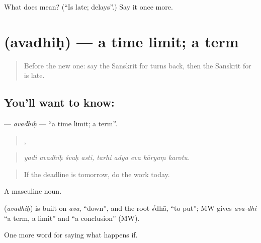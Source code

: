 \begin{tcolorbox}[breakable,colback=teal!4,colframe=teal!35!black,title={Before you move on}]
What does  mean? (\textquotedblleft{}Is late; delays\textquotedblright{}.) Say it once more.
\end{tcolorbox}
\section[\texorpdfstring{\sk{अवधिः} (avadhiḥ)}{अवधिः (avadhiḥ)}]{ (avadhiḥ) — a time limit; a term}

\label{lesson:SA-C371-avadhih}



\begin{quote}
Before the new one: say the Sanskrit for turns back, then the Sanskrit for is late.
\end{quote}

\subsection*{You'll want to know: }
\textbf{} — \emph{avadhiḥ} — \textquotedblleft{}a time limit; a term\textquotedblright{}.

\begin{quote}
   ,     
\end{quote}

\begin{quote}
\emph{yadi avadhiḥ śvaḥ asti, tarhi adya eva kāryaṃ karotu.}
\end{quote}

\begin{quote}
If the deadline is tomorrow, do the work today.
\end{quote}

A masculine noun.

\begin{cousinweb}
\textbf{} (\emph{avadhiḥ}) is built on \emph{ava}, \textquotedblleft{}down\textquotedblright{}, and the root √dhā, \textquotedblleft{}to put\textquotedblright{}; MW gives \emph{ava-dhi} \textquotedblleft{}a term, a limit\textquotedblright{} and \textquotedblleft{}a conclusion\textquotedblright{} (MW).
\end{cousinweb}

\begin{grammarlens}[title={What you've built}]
One more word for saying what happens if.
\end{grammarlens}


